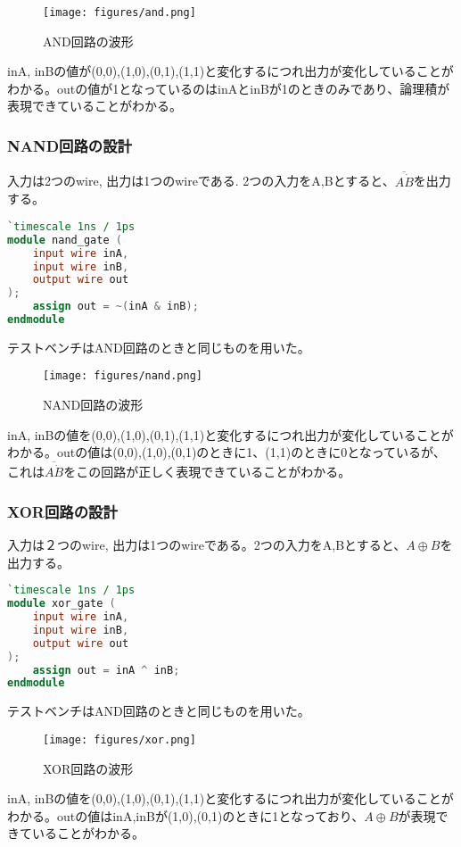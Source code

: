 \documentclass{ltjsarticle}
\begin{document}
\begin{figure}[H]
    \begin{center}
        \texttt{[image: figures/and.png]}
        \caption{AND回路の波形}
    \end{center}
\end{figure}
inA, inBの値が(0,0),(1,0),(0,1),(1,1)と変化するにつれ出力が変化していることがわかる。outの値が1となっているのはinAとinBが1のときのみであり、論理積が表現できていることがわかる。

\subsubsection{NAND回路の設計}
入力は2つのwire, 出力は1つのwireである. 2つの入力をA,Bとすると、$\overline{A\dot B}$を出力する。

\begin{lstlisting}[caption=NANDデザイン,language=verilog]
`timescale 1ns / 1ps
module nand_gate (
    input wire inA,
    input wire inB,
    output wire out
);
    assign out = ~(inA & inB);
endmodule
\end{lstlisting}
テストベンチはAND回路のときと同じものを用いた。

\begin{figure}[H]
    \begin{center}
        \texttt{[image: figures/nand.png]}
        \caption{NAND回路の波形}
    \end{center}
\end{figure}
inA, inBの値を(0,0),(1,0),(0,1),(1,1)と変化するにつれ出力が変化していることがわかる。outの値は(0,0),(1,0),(0,1)のときに1、(1,1)のときに0となっているが、これは$\overline{A\dot B}$をこの回路が正しく表現できていることがわかる。

\subsubsection{XOR回路の設計}
入力は２つのwire, 出力は1つのwireである。2つの入力をA,Bとすると、$A \oplus B$を出力する。
\begin{lstlisting}[caption=XORデザイン, language=verilog]
`timescale 1ns / 1ps
module xor_gate (
    input wire inA,
    input wire inB,
    output wire out
);
    assign out = inA ^ inB;
endmodule
\end{lstlisting}
テストベンチはAND回路のときと同じものを用いた。
\begin{figure}[H]
    \begin{center}
        \texttt{[image: figures/xor.png]}
        \caption{XOR回路の波形}
    \end{center}
\end{figure}
inA, inBの値を(0,0),(1,0),(0,1),(1,1)と変化するにつれ出力が変化していることがわかる。outの値はinA,inBが(1,0),(0,1)のときに1となっており、$A \oplus B$が表現できていることがわかる。
\end{document}
